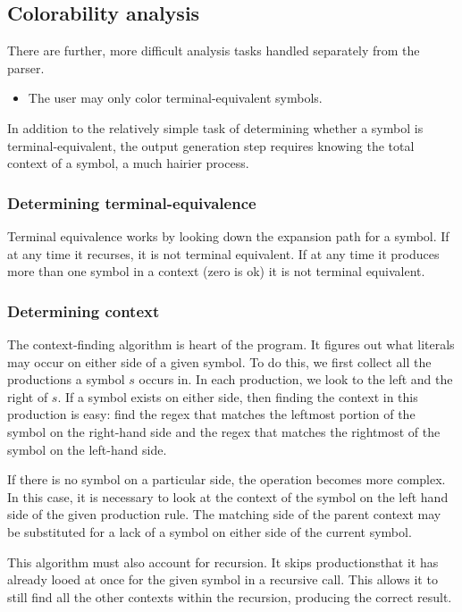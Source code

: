 \documentclass[]{article}
\begin{document}
  \subsection{Colorability analysis}
  There are further, more difficult analysis tasks handled separately
  from the parser.
  \begin{itemize}
  \item The user may only color terminal-equivalent symbols.
  \end{itemize}

  In addition to the relatively simple task of determining whether a
  symbol is terminal-equivalent, the output generation step requires
  knowing the total context of a symbol, a much hairier process.
  
  \subsubsection{Determining terminal-equivalence}

  Terminal equivalence works by looking down the expansion path for a
  symbol. If at any time it recurses, it is not terminal equivalent.
  If at any time it produces more than one symbol in a context (zero
  is ok) it is not terminal equivalent.

  \subsubsection{Determining context}
  The context-finding algorithm is heart of the program. It figures out what literals may occur on either side of a given symbol. To do this, we first collect all the productions a symbol $s$ occurs in. In each production, we look to the left and the right of $s$. If a symbol exists on either side, then finding the context in this production is easy: find the regex that matches the leftmost portion of the symbol on the right-hand side and the regex that matches the rightmost of the symbol on the left-hand side.

  If there is no symbol on a particular side, the operation becomes
  more complex. In this case, it is necessary to look at the context of the symbol on the left hand side of the given production rule. The matching side of the parent context may be substituted for a lack of a symbol on either side of the current symbol.

  This algorithm must also account for recursion.  It skips productionsthat it has already looed at once for the given symbol in a recursive call.  This allows it to still find all the other contexts within the recursion, producing the correct result.
\end{document}
